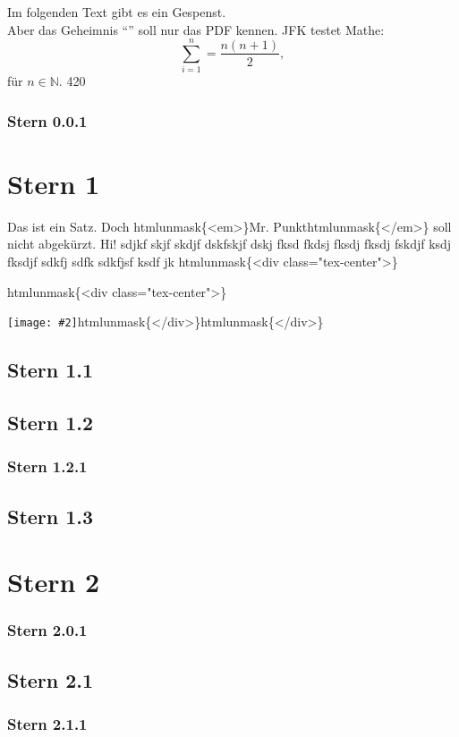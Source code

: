 \documentclass{article}
\title{\mytitle}
\newcommand{\mytitle}{How To Zotero: Gardner/Springfeld-CSL}
\newif\ifhtml
\newcommand{\htmlonly}[1]{\ifhtml#1\fi}
\newif\ifpdf
\newcommand{\pdfonly}[1]{\ifpdf#1\fi}
\newcommand{\htmltagunique}[1]{htmlunmask\{#1\}}
\newcommand{\htmltag}[3]{\htmltagunique{#1}#2\htmltagunique{#3}}
\newcommand{\htmltagunique}[1]{}
\newcommand{\htmltag}[3]{#2}
\renewenvironment{center}
	{\htmltagunique{<div class="tex-center">}\item[]}
	{\htmltagunique{</div>}}
\newcommand{\incl}[2]{\begin{center}\texttt{[image: \#2]}\end{center}}
\newcommand{\inclc}[2]{\begin{center}\incl{#1}{#2}\end{center}}
\begin{document}
\pdfonly{
\begin{center}
{\LARGE\textbf\mytitle}
\end{center}
\tableofcontents
}
Im folgenden Text gibt es ein \htmlonly{verstecktes} Gespenst.
\\
Aber das Geheimnis ``\pdfonly{hihihi}'' soll nur das PDF kennen. JFK testet Mathe:
\[
	\sum_{i=1}^n=\frac{n(n+1)}{2},
\]
f\"ur \(n\in\mathbb{N}\).
420\htmlonly{69}
\pdfonly{pdfonly} \htmlonly{htmlonly}
\pagestyle{fancy}
\subsubsection{Stern 0.0.1}
\section{Stern 1}
Das ist ein Satz. Doch \htmltag{<em>}{Mr. Punkt}{</em>} soll nicht abgek\"urzt. Hi! sdjkf skjf skdjf dskfskjf dskj fksd fkdsj fksdj fksdj fskdjf ksdj fksdjf sdkfj sdfk sdkfjsf ksdf jk
\inclc{0.5}{res/smile.png}
\subsection{Stern 1.1}
\subsection{Stern 1.2}
\subsubsection{Stern 1.2.1}
\subsection{Stern 1.3}
\section{Stern 2}
\subsubsection{Stern 2.0.1}
\subsection{Stern 2.1}
\subsubsection{Stern 2.1.1}
\end{document}

